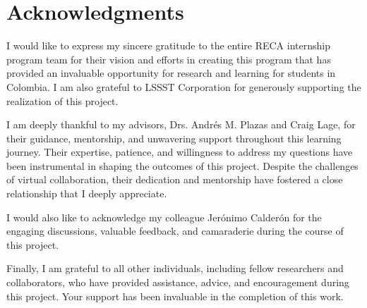 \section{Acknowledgments} \label{sec:acknowledgments}


I would like to express my sincere gratitude to the entire RECA internship program team for their vision and efforts in creating this program that has provided an invaluable opportunity for research and learning for students in Colombia. I am also grateful to LSSST Corporation for generously supporting the realization of this project.

I am deeply thankful to my advisors, Drs. Andrés M. Plazas and Craig Lage, for their guidance, mentorship, and unwavering support throughout this learning journey. Their expertise, patience, and willingness to address my questions have been instrumental in shaping the outcomes of this project. Despite the challenges of virtual collaboration, their dedication and mentorship have fostered a close relationship that I deeply appreciate.

I would also like to acknowledge my colleague Jerónimo Calderón for the engaging discussions, valuable feedback, and camaraderie during the course of this project.

Finally, I am grateful to all other individuals, including fellow researchers and collaborators, who have provided assistance, advice, and encouragement during this project. Your support has been invaluable in the completion of this work.